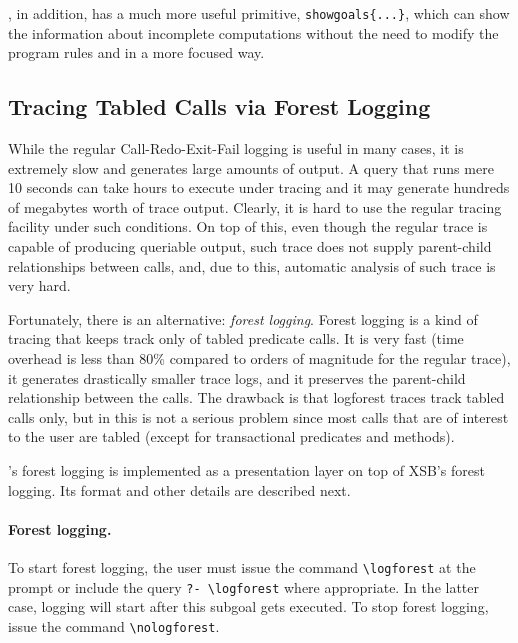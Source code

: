 \documentclass[11pt]{article}
\newcommand{\ERGO}{\mbox{\smaller{\ensuremath{\cal{E}}\smaller{{\sc{RGO}}}}}\xspace}
\newcommand{\FLSYSTEM}{\ERGO}
\newcommand{\bs}{\textbackslash}
\begin{document}
\ERGO, in addition, has a much more useful primitive,
\texttt{showgoals\{...\}}, which can show the information about incomplete
computations without the need to modify the program rules and in a more
focused way.





\subsection{Tracing Tabled Calls via Forest Logging}\label{sec-logforest}

While the regular Call-Redo-Exit-Fail logging is useful in many cases, it
is extremely slow and generates large amounts of output. A query that
runs mere 10 seconds can take hours to execute under tracing and it may
generate hundreds of megabytes worth of trace output. Clearly, it is hard
to use the regular tracing facility under such conditions.
On top of this, even though the regular trace is capable of producing
queriable output, such trace does not supply parent-child 
relationships between calls, and, due to this, automatic analysis of
such trace is very hard.

Fortunately, there is an alternative: \emph{forest logging}.
Forest logging is a kind of tracing that keeps track only of tabled
predicate calls. It is very fast (time overhead is less than 80\% compared
to orders of magnitude for the regular trace), it generates
drastically smaller trace logs, and it preserves the parent-child
relationship between the calls. The drawback is that logforest
traces track tabled calls
only, but in \FLSYSTEM this is not a serious problem since most calls that
are of interest to the user are
tabled (except for transactional predicates and methods).

\FLSYSTEM's forest logging is 
implemented as a presentation layer on top of XSB's forest logging.
Its format and other details are described next.

\paragraph{Forest logging.}
To start forest logging, the user
must issue the command {\tt \bs{}logforest} at the \FLSYSTEM
prompt or include the query {\tt ?- \bs{}logforest} where appropriate.
In the latter case, logging will start after this subgoal gets executed. 
To stop forest logging, issue the command {\tt \bs{}nologforest}. 
\end{document}
